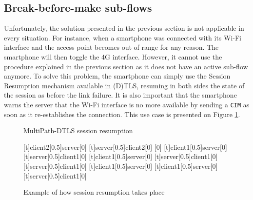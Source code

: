 \subsection{Break-before-make sub-flows\label{sec:breakbeforemake}}
Unfortunately, the solution presented in the previous section is not applicable in every situation. For instance, when a smartphone was connected with its Wi-Fi interface and the access point becomes out of range for any reason. The smartphone will then toggle the 4G interface. However, it cannot use the procedure explained in the previous section as it does not have an active sub-flow anymore. To solve this problem, the smartphone can simply use the Session Resumption mechanism available in (D)TLS, resuming in both sides the state of the session as before the link failure. It is also important that the smartphone warns the server that the Wi-Fi interface is no more available by sending a \texttt{CIM} as soon as it re-establishes the connection. This use case is presented on Figure \ref{fig:dtls-sessionresumption}.

\begin{figure}[!ht]
\centering
\begin{msc}[r]{MultiPath-DTLS session resumption}

\setlength{\instfootheight}{0em}
\setlength{\instheadheight}{0em}
\setlength{\instdist}{0.33\linewidth}
\setlength{\levelheight}{3em}


[t]{client2}[0.5]{server}[0]
\nextlevel
{}[t]{server}[0.5]{client2}[0]
\nextlevel
{}[0]
\nextlevel
{}
\nextlevel
{}
\nextlevel
{}[t]{client1}[0.5]{server}[0]
\nextlevel
{}[t]{server}[0.5]{client1}[0]
\nextlevel
{}[t]{client1}[0.5]{server}[0]
\nextlevel
{}[t]{server}[0.5]{client1}[0]
\nextlevel
{}[t]{server}[0.5]{client1}[0]
\nextlevel
{}[t]{client1}[0.5]{server}[0]
\nextlevel
{}[t]{client1}[0.5]{server}[0]
\nextlevel
{}[t]{server}[0.5]{client1}[0]
\nextlevel[2]

\end{msc}
\caption{Example of how session resumption takes place}
\label{fig:dtls-sessionresumption}
\end{figure}

